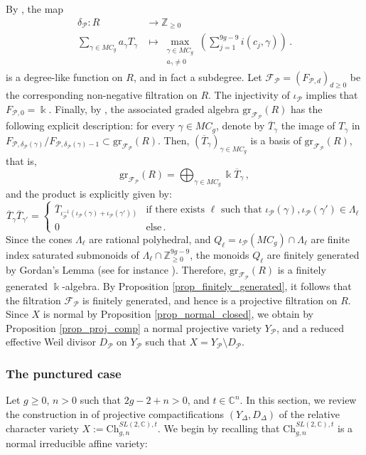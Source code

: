 \documentclass[12pt,letterpaper, reqno]{amsart}
\theoremstyle{defstyle} \newtheorem{definition}[theorem]{Definition}
\theoremstyle{remark}
\numberwithin{equation}{section}
\numberwithin{figure}{section}
\newcommand{\cF} {\mathcal{F}}
\newcommand{\gr} {\mathrm{gr}}
\newcommand{\kk} {\Bbbk}
\newcommand{\CC} {\mathbb{C}}
\newcommand{\ZZ} {\mathbb{Z}}
\newcommand{\cP} {\mathcal{P}}
\begin{document}
By \cite[Theorem 1.5]{ayilliath2025geometric}, the map
\begin{align} \label{eq_delta_P}
\delta_\cP: R &\longrightarrow \ZZ_{\geq 0}\\   \nonumber
\sum_{\gamma \in MC_{g}} a_\gamma T_\gamma &\longmapsto \max_{\substack{\gamma \in MC_g \\ a
_\gamma \neq 0}} \left( \sum_{j=1}^{9g-9} i(c_j, \gamma) \right) \,.
\end{align}  is a degree-like function on $R$, and in fact a subdegree. Let $\cF_\cP=(F_{\cP,d})_{d\geq 0}$ be the corresponding non-negative filtration on $R$. 
The injectivity of $\iota_\cP$ implies that $F_{\cP,0}=\kk$.
Finally, by \cite[Theorem 4.2]{ayilliath2025geometric}, the associated graded algebra $\gr_{\cF_\cP}(R)$ has the following explicit description: for every $\gamma \in MC_g$, denote by $\overline{T}_\gamma$ the image of $T_\gamma$ in $F_{\cP, \delta_\cP(\gamma)}/F_{\cP, \delta_\cP(\gamma)-1} \subset \gr_{\cF_\cP}(R)$. Then, $(\overline{T}_\gamma)_{\gamma \in MC_g}$ is a basis of $\gr_{\cF_\cP}(R)$, that is,
\[ \gr_{\cF_\cP}(R) = \bigoplus_{\gamma \in MC_g} \kk \overline{T}_\gamma \,,\]
and the product is explicitly given by:
\begin{equation} \label{eq_algebra_compact}
\overline{T}_\gamma \overline{T}_{\gamma'}
=\begin{cases} \overline{T}_{\iota_{\cP}^{-1}(\iota_\cP(\gamma)+ \iota_\cP(\gamma'))} &\text{if there exists  }\ell \text{   such that }\iota_\cP(\gamma), \iota_{\cP}(\gamma') \in \Lambda_\ell\\ 0&\text{else}\,.\end{cases}
\end{equation}
Since the cones $\Lambda_\ell$ are rational polyhedral, and $Q_\ell=\iota_\cP(MC_g) \cap \Lambda_\ell$
are finite index saturated submonoids of $\Lambda_\ell \cap \ZZ_{\geq 0}^{9g-9}$, the monoids $Q_\ell$ are finitely generated by Gordan's Lemma (see for instance \cite[Proposition 1.2.17]{CLS}). Therefore, $
\gr_{\cF_{\cP}}(R)$ is a finitely generated $\kk$-algebra.
By Proposition \ref{prop_finitely_generated}, it follows that the filtration $\cF_\cP$ is finitely generated, and hence is a projective filtration on $R$.
Since $X$ is normal by Proposition \ref{prop_normal_closed}, we obtain by Proposition \ref{prop_proj_comp} 
a normal projective variety $Y_\cP$, and a reduced effective Weil divisor $D_\cP$ on $Y_\cP$ such that $X=Y_\cP \setminus D_\cP$. 

\subsubsection{The punctured case} 
\label{sec_review_punctured}
Let $g \geq 0$, $n>0$ such that $2g-2+n>0$, and $t \in \CC^n$. In this section, we review the construction in 
\cite{farajzadeh2023compactifications} of projective compactifications $(Y_\Delta, D_\Delta)$ of the relative character variety $X:= \mathrm{Ch}_{g,n}^{SL(2,\CC),t}$. We begin by recalling that $\mathrm{Ch}_{g,n}^{SL(2,\CC),t}$ is a normal irreducible affine variety: 
\end{document}
